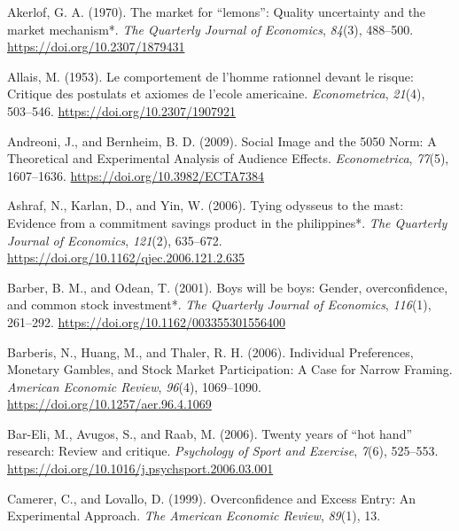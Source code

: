\documentclass[
  letterpaper,
  DIV=11,
  numbers=noendperiod]{scrreprt}
\newlength{\cslhangindent}
\newlength{\cslentryspacingunit} %
\newenvironment{CSLReferences}[2] %
 {%
  \setlength{\parindent}{0pt}
  \ifodd #1
  \let\oldpar\par
  \def\par{\hangindent=\cslhangindent\oldpar}
  \fi
  \setlength{\parskip}{#2\cslentryspacingunit}
 }%
 {}
\begin{document}
\hypertarget{refs}{}
\begin{CSLReferences}{1}{0}
\leavevmode{}%
Akerlof, G. A. (1970). The market for {``}lemons{''}: Quality
uncertainty and the market mechanism*. \emph{The Quarterly Journal of
Economics}, \emph{84}(3), 488--500.
\url{https://doi.org/10.2307/1879431}

\leavevmode{}%
Allais, M. (1953). Le comportement de l'homme rationnel devant le
risque: Critique des postulats et axiomes de l'ecole americaine.
\emph{Econometrica}, \emph{21}(4), 503--546.
\url{https://doi.org/10.2307/1907921}

\leavevmode{}%
Andreoni, J., and Bernheim, B. D. (2009). Social Image and the
50{\textendash}50 Norm: A Theoretical and Experimental Analysis of
Audience Effects. \emph{Econometrica}, \emph{77}(5), 1607--1636.
\url{https://doi.org/10.3982/ECTA7384}

\leavevmode{}%
Ashraf, N., Karlan, D., and Yin, W. (2006). Tying odysseus to the mast:
Evidence from a commitment savings product in the philippines*.
\emph{The Quarterly Journal of Economics}, \emph{121}(2), 635--672.
\url{https://doi.org/10.1162/qjec.2006.121.2.635}

\leavevmode{}%
Barber, B. M., and Odean, T. (2001). Boys will be boys: Gender,
overconfidence, and common stock investment*. \emph{The Quarterly
Journal of Economics}, \emph{116}(1), 261--292.
\url{https://doi.org/10.1162/003355301556400}

\leavevmode{}%
Barberis, N., Huang, M., and Thaler, R. H. (2006). Individual
Preferences, Monetary Gambles, and Stock Market Participation: A Case
for Narrow Framing. \emph{American Economic Review}, \emph{96}(4),
1069--1090. \url{https://doi.org/10.1257/aer.96.4.1069}

\leavevmode{}%
Bar-Eli, M., Avugos, S., and Raab, M. (2006). Twenty years of {``}hot
hand{''} research: Review and critique. \emph{Psychology of Sport and
Exercise}, \emph{7}(6), 525--553.
\url{https://doi.org/10.1016/j.psychsport.2006.03.001}

\leavevmode{}%
Camerer, C., and Lovallo, D. (1999). Overconfidence and Excess Entry: An
Experimental Approach. \emph{The American Economic Review},
\emph{89}(1), 13.


\end{CSLReferences}
\end{document}
